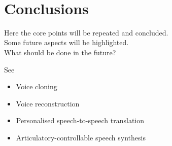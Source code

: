 

\

\newpage

\section{Conclusions}
\label{sec:conclusion}

Here the core points will be repeated and concluded.\\
Some future aspects will be highlighted.\\
What should be done in the future?

\vspace{2em}
See \cite{edinburgh:speech}
\begin{itemize}[leftmargin=10pt]
	\item Voice cloning
	\item Voice reconstruction
	\item Personalised speech-to-speech translation
	\item Articulatory-controllable speech synthesis
\end{itemize}
